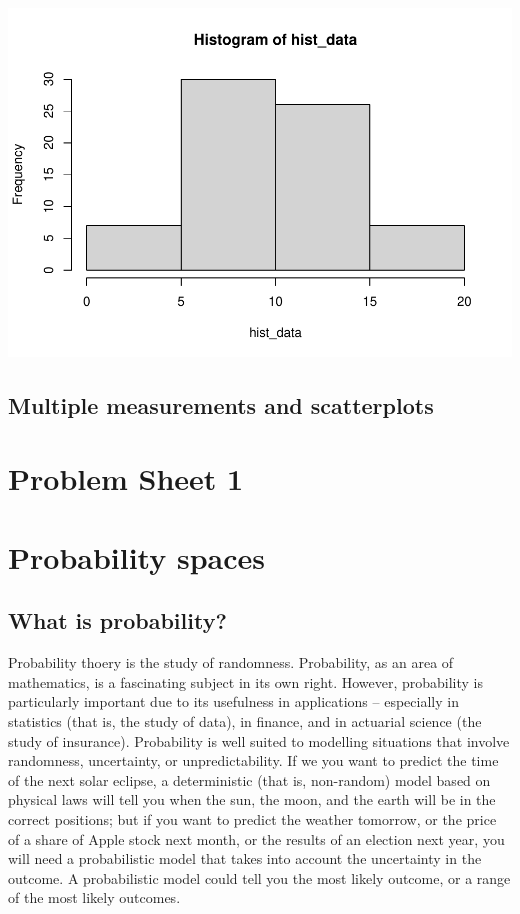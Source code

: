 \documentclass[
  a4paper,
]{book}
\theoremstyle{definition}
\theoremstyle{definition}
\theoremstyle{definition}
\theoremstyle{remark}
\begin{document}
\includegraphics{math1710_files/figure-latex/unnamed-chunk-2-2.pdf}

\hypertarget{multiple}{%
\section{Multiple measurements and scatterplots}\label{multiple}}

\hypertarget{P1}{%
\chapter*{Problem Sheet 1}\label{P1}}

\hypertarget{S02-probability}{%
\chapter{Probability spaces}\label{S02-probability}}

\renewcommand{\complement}{\mathsf{c}}
\newcommand{\comp}{\complement}

\hypertarget{what-is-prob}{%
\section{What is probability?}\label{what-is-prob}}

Probability thoery is the study of randomness. Probability, as an area of mathematics, is a fascinating subject in its own right. However, probability is particularly important due to its usefulness in applications -- especially in statistics (that is, the study of data), in finance, and in actuarial science (the study of insurance). Probability is well suited to modelling situations that involve randomness, uncertainty, or unpredictability. If we you want to predict the time of the next solar eclipse, a deterministic (that is, non-random) model based on physical laws will tell you when the sun, the moon, and the earth will be in the correct positions; but if you want to predict the weather tomorrow, or the price of a share of Apple stock next month, or the results of an election next year, you will need a probabilistic model that takes into account the uncertainty in the outcome. A probabilistic model could tell you the most likely outcome, or a range of the most likely outcomes.
\end{document}
